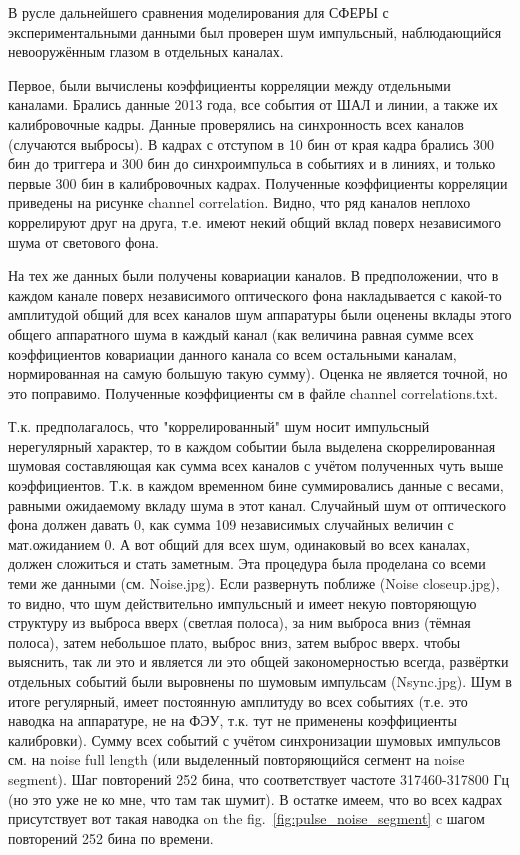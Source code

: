 \documentclass[final,5p,times,twocolumn]{elsarticle}
\begin{document}
{\Russian

В русле дальнейшего сравнения моделирования для СФЕРЫ с экспериментальными данными был проверен шум импульсный, наблюдающийся невооружённым глазом в отдельных каналах.

Первое, были вычислены коэффициенты корреляции между отдельными каналами. Брались данные 2013 года, все события от ШАЛ и линии, а также их калибровочные кадры. Данные проверялись на синхронность всех каналов (случаются выбросы). В кадрах с отступом в 10 бин от края кадра брались 300 бин до триггера и 300 бин до синхроимпульса в событиях и в линиях, и только первые 300 бин в калибровочных кадрах. Полученные коэффициенты корреляции приведены на рисунке channel correlation. Видно, что ряд каналов неплохо коррелируют друг на друга, т.е. имеют некий общий вклад поверх независимого шума от светового фона.

На тех же данных были получены ковариации каналов. В предположении, что в каждом канале поверх независимого оптического фона накладывается с какой-то амплитудой общий для всех каналов шум аппаратуры были оценены вклады этого общего аппаратного шума в каждый канал (как величина равная сумме всех коэффициентов ковариации данного канала со всем остальными каналам, нормированная на самую большую такую сумму). Оценка не является точной, но это поправимо. Полученные коэффициенты см в файле channel correlations.txt.

Т.к. предполагалось, что "коррелированный" шум носит импульсный нерегулярный характер, то в каждом событии была выделена скоррелированная шумовая составляющая как сумма всех каналов с учётом полученных чуть выше коэффициентов. Т.к. в каждом временном бине суммировались данные с весами, равными ожидаемому вкладу шума в этот канал. Случайный шум от оптического фона должен давать 0, как сумма 109 независимых случайных величин с мат.ожиданием 0. А вот общий для всех шум, одинаковый во всех каналах, должен сложиться и стать заметным.
Эта процедура была проделана со всеми теми же данными (см. Noise.jpg). Если развернуть поближе (Noise  closeup.jpg), то видно, что шум действительно импульсный и имеет некую повторяющую структуру из выброса вверх (светлая полоса), за ним выброса вниз (тёмная полоса), затем небольшое плато, выброс вниз, затем выброс вверх. чтобы выяснить, так ли это и является ли это общей закономерностью всегда, развёртки отдельных событий были выровнены по шумовым импульсам (Nsync.jpg). Шум в итоге регулярный, имеет постоянную амплитуду во всех событиях (т.е. это наводка на аппаратуре, не на ФЭУ, т.к. тут не применены коэффициенты калибровки).
Сумму всех событий с учётом синхронизации шумовых импульсов см. на noise full length (или выделенный повторяющийся сегмент на noise segment). Шаг повторений 252 бина, что соответствует частоте 317460-317800 Гц (но это уже не ко мне, что там так шумит). В остатке имеем, что во всех кадрах присутствует вот такая наводка on the fig.~\ref{fig:pulse_noise_segment}  c шагом повторений 252 бина по времени.

}
\end{document}
